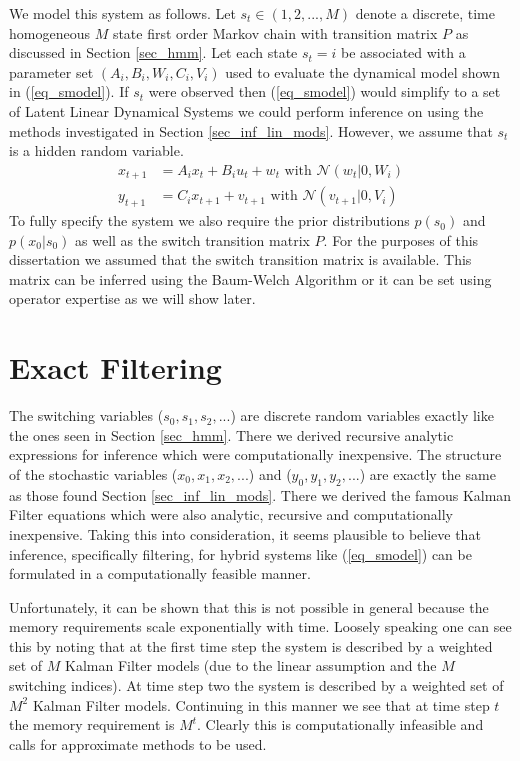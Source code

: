 We model this system as follows. Let $s_t \in (1,2,..., M)$ denote a discrete, time homogeneous $M$ state first order Markov chain with transition matrix $P$ as discussed in Section \ref{sec_hmm}. Let each state $s_t=i$ be associated with a parameter set $\left(A_i, B_i, W_i, C_i, V_i \right)$ used to evaluate the dynamical model shown in (\ref{eq_smodel}). If $s_t$ were observed then (\ref{eq_smodel}) would simplify to a set of Latent Linear Dynamical Systems we could perform inference on using the methods investigated in Section \ref{sec_inf_lin_mods}. However, we assume that $s_t$ is a hidden random variable.
\begin{equation}
\begin{aligned}
x_{t+1} &= A_ix_t + B_iu_t + w_{t} \text{ with } \mathcal{N}(w_{t}|0,W_i) \\
y_{t+1} &= C_ix_{t+1} + v_{t+1}  \text{ with } \mathcal{N}(v_{t+1}|0,V_i)
\end{aligned}
\label{eq_smodel}
\end{equation}
To fully specify the system we also require the prior distributions $p(s_0)$ and $p(x_0|s_0)$ as well as the switch transition matrix $P$. For the purposes of this dissertation we assumed that the switch transition matrix is available. This matrix can be inferred using the Baum-Welch Algorithm or it can be set using operator expertise as we will show later.

\section{Exact Filtering}
The switching variables ($s_0, s_1, s_2,...$) are discrete random variables exactly like the ones seen in Section \ref{sec_hmm}. There we derived recursive analytic expressions for inference which were computationally inexpensive. The structure of the stochastic variables ($x_0, x_1,x_2,...$) and ($y_0,y_1, y_2,...$) are exactly the same as those found Section \ref{sec_inf_lin_mods}. There we derived the famous Kalman Filter equations which were also analytic, recursive and computationally inexpensive. Taking this into consideration, it seems plausible to believe that inference, specifically filtering, for hybrid systems like (\ref{eq_smodel}) can be formulated in a computationally feasible manner. 

Unfortunately, it can be shown that this is not possible in general \cite{lerner}\cite{murphy3} because the memory requirements scale exponentially with time. Loosely speaking one can see this by noting that at the first time step the system is described by a weighted set of $M$ Kalman Filter models (due to the linear assumption and the $M$ switching indices). At time step two the system is described by a weighted set of $M^2$ Kalman Filter models. Continuing in this manner we see that at time step $t$ the memory requirement is $M^t$. Clearly this is computationally infeasible and calls for approximate methods to be used. 

